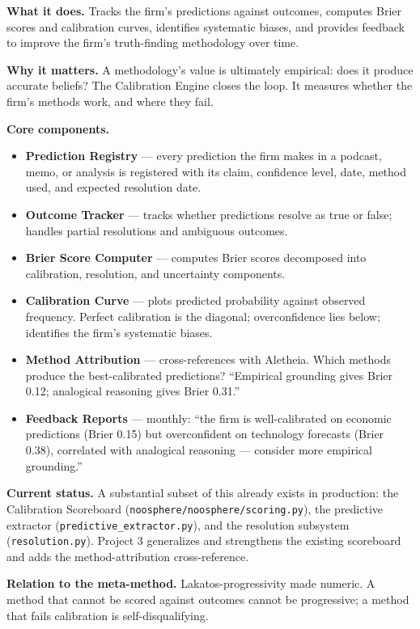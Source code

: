\documentclass[11pt,letterpaper]{article}
\newcommand{\file}[1]{\texttt{#1}}
\begin{document}
\textbf{What it does.} Tracks the firm's predictions against outcomes, computes Brier scores and calibration curves, identifies systematic biases, and provides feedback to improve the firm's truth-finding methodology over time.

\textbf{Why it matters.} A methodology's value is ultimately empirical: does it produce accurate beliefs? The Calibration Engine closes the loop. It measures whether the firm's methods work, and where they fail.

\textbf{Core components.}

\begin{itemize}[leftmargin=1.5em,itemsep=0.1em]
\item \textbf{Prediction Registry} --- every prediction the firm makes in a podcast, memo, or analysis is registered with its claim, confidence level, date, method used, and expected resolution date.
\item \textbf{Outcome Tracker} --- tracks whether predictions resolve as true or false; handles partial resolutions and ambiguous outcomes.
\item \textbf{Brier Score Computer} --- computes Brier scores decomposed into calibration, resolution, and uncertainty components.
\item \textbf{Calibration Curve} --- plots predicted probability against observed frequency. Perfect calibration is the diagonal; overconfidence lies below; identifies the firm's systematic biases.
\item \textbf{Method Attribution} --- cross-references with Aletheia. Which methods produce the best-calibrated predictions? ``Empirical grounding gives Brier 0.12; analogical reasoning gives Brier 0.31.''
\item \textbf{Feedback Reports} --- monthly: ``the firm is well-calibrated on economic predictions (Brier 0.15) but overconfident on technology forecasts (Brier 0.38), correlated with analogical reasoning --- consider more empirical grounding.''
\end{itemize}

\textbf{Current status.} A substantial subset of this already exists in production: the Calibration Scoreboard (\file{noosphere/noosphere/scoring.py}), the predictive extractor (\file{predictive\_extractor.py}), and the resolution subsystem (\file{resolution.py}). Project 3 generalizes and strengthens the existing scoreboard and adds the method-attribution cross-reference.

\textbf{Relation to the meta-method.} Lakatos-progressivity made numeric. A method that cannot be scored against outcomes cannot be progressive; a method that fails calibration is self-disqualifying.
\end{document}
